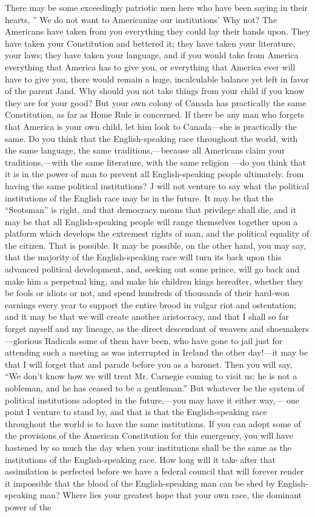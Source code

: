 \documentclass[11pt,openany]{book}
\begin{document}
There may be some exceedingly patriotic men here who have been saying in their hearts, '' We do not want to Americanize our institutions' Why not? The Americans have taken from you everything they could lay their hands upon. They have taken your Constitution and bettered it; they have taken your literature, your laws; they have taken your language, and if you would take from America everything that America has to give you, or everything that America ever will have to give you, there would remain a huge, incalculable balance yet left in favor of the parent Jand. Why should you not take things from your child if you know they are for your good? But your own colony of Canada has practically the same Constitution, as far as Home Rule is concerned. If there be any man who forgets that America is your own child, let him look to Canada---she is practically the same. Do you think that the English-speaking race throughout the world, with the same language, the same traditions,---because all Americans claim your traditions,---with the same literature, with the same religion ---do you think that it is in the power of man to prevent all English-speaking people ultimately. from having the same political institutions? J will not venture to say what the political institutions of the English race may be in the future. It may be that the ``Scotsman'' is right, and that democracy means that privilege shall die, and it may be that all English-speaking people will range themselves together upon a platform which develops the extremest rights of man, and the political equality of the citizen. That is possible. It may be possible, on the other hand, you may say, that the majority of the English-speaking race will turn its back upon this advanced political development, and, seeking out some prince, will go back and make him a perpetual king, and make his children kings hereafter, whether they be fools or idiots or not, and spend hundreds of thousands of their hard-won earnings every year to support the entire brood in vulgar riot and ostentation; and it may be that we will create another aristocracy, and that I shall so far forget myself and my lineage, as the direct descendant of weavers and shoemakers---glorious Radicals some of them have been, who have gone to jail just for attending such a meeting as was interrupted in Ireland the other day!---it may be that I will forget that and parade before you as a baronet. Then you will say, ``We don't know how we will treat Mr. Carnegie coming to visit us; he is not a nobleman, and he has ceased to be a gentleman.'' But whatever be the system of political institutions adopted in the future,---you may have it either way,--- one point I venture to stand by, and that is that the English-speaking race throughout the world is to have the same institutions. If you can adopt some of the provisions of the American Constitution for this emergency, you will have hastened by so much the day when your institutions shall be the same as the institutions of the English-speaking race. How long will it take after that assimilation is perfected before we have a federal council that will forever render it impossible that the blood of the English-speaking man can be shed by English-speaking man? Where lies your greatest hope that your own race, the dominant power of the 
\end{document}
